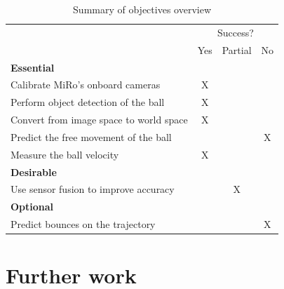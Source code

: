 \begin{table}[H]
\begin{tabular}{l|ccc|}
\cline{2-4}
                                                              & \multicolumn{3}{c|}{Success?}                                \\ \cline{2-4} 
                                                              & \multicolumn{1}{c|}{Yes} & \multicolumn{1}{c|}{Partial} & No \\ \hline
\multicolumn{1}{|l|}{\textbf{Essential}}                      & \multicolumn{3}{l|}{}                                        \\ \hline
\multicolumn{1}{|l|}{Calibrate MiRo’s onboard cameras}        & \multicolumn{1}{c|}{X}   & \multicolumn{1}{c|}{}        &    \\ \hline
\multicolumn{1}{|l|}{Perform object detection of the ball}    & \multicolumn{1}{c|}{X}   & \multicolumn{1}{c|}{}        &    \\ \hline
\multicolumn{1}{|l|}{Convert from image space to world space} & \multicolumn{1}{c|}{X}   & \multicolumn{1}{c|}{}        &    \\ \hline
\multicolumn{1}{|l|}{Predict the free movement of the ball}   & \multicolumn{1}{c|}{}    & \multicolumn{1}{c|}{}        & X  \\ \hline
\multicolumn{1}{|l|}{Measure the ball velocity}               & \multicolumn{1}{c|}{X}   & \multicolumn{1}{c|}{}        &    \\ \hline
\multicolumn{1}{|l|}{\textbf{Desirable}}                      & \multicolumn{3}{l|}{}                                        \\ \hline
\multicolumn{1}{|l|}{Use sensor fusion to improve accuracy}   & \multicolumn{1}{c|}{}    & \multicolumn{1}{c|}{X}       &    \\ \hline
\multicolumn{1}{|l|}{\textbf{Optional}}                       & \multicolumn{3}{l|}{}                                        \\ \hline
\multicolumn{1}{|l|}{Predict bounces on the trajectory}       & \multicolumn{1}{c|}{}    & \multicolumn{1}{c|}{}        & X  \\ \hline
\end{tabular}
\caption{Summary of objectives overview}
\label{tab:objectives overview}
\end{table}

\section{Further work}


